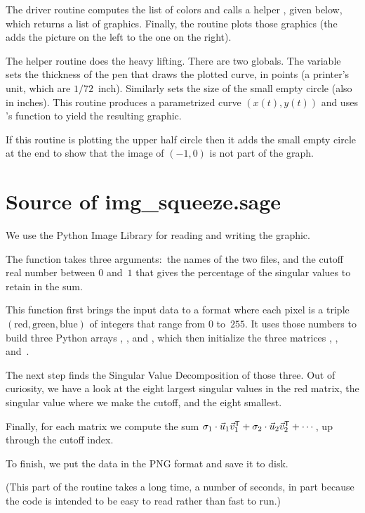 The driver routine computes the list of colors and 
calls a helper , 
given below, which returns a list of graphics.
Finally, the routine plots those graphics
(the \inlinecode{+=} adds the picture on the left to the one on the right).


The helper routine does the heavy lifting.
There are two globals.
The variable  sets the thickness of 
the pen that draws the plotted curve, in points (a printer's unit, which are $1/72$~inch).
Similarly  sets the size of the small empty circle
(also in inches).
This routine produces a parametrized curve $(x(t),y(t))$ and uses \Sage's
 function to yield the resulting graphic.

If this routine is plotting the upper half circle then it adds the
small empty circle at the end to show that the image of $(-1,0)$
is not part of the graph.




\section{Source of img\_squeeze.sage}
We use the Python Image Library for reading and writing the graphic.

The function
takes three arguments:~the names of the two files, and
the cutoff real number between $0$ and~$1$ that gives the percentage 
of the singular values to retain in the sum.


This function first brings the input data to a format where each
pixel is a triple 
$(\text{red}, \text{green},\text{blue})$ of integers that range from 
$0$ to~$255$.
It uses those numbers to build 
three Python arrays , ,
and , which then initialize the 
three \Sage{} matrices ,
, and~.


The next step finds the Singular Value Decomposition of those three.
Out of curiosity, we have a look at the eight largest singular
values in the red matrix, the singular value where we make the cutoff,
and the eight smallest.


Finally, for each matrix we compute the sum
$\sigma_1\cdot\vec{u}_1{{\vec{v}}^{\mathsf{T}}}_1+\sigma_2\cdot\vec{u}_2{{\vec{v}}^{\mathsf{T}}}_2
   +\cdots\,$,
up through the cutoff index.


To finish, we put the data in the PNG format and save it to 
disk.

(This part of the routine takes a long time, a number of seconds, in part because
the code is intended to be easy to read rather than fast to run.)

\endinput


